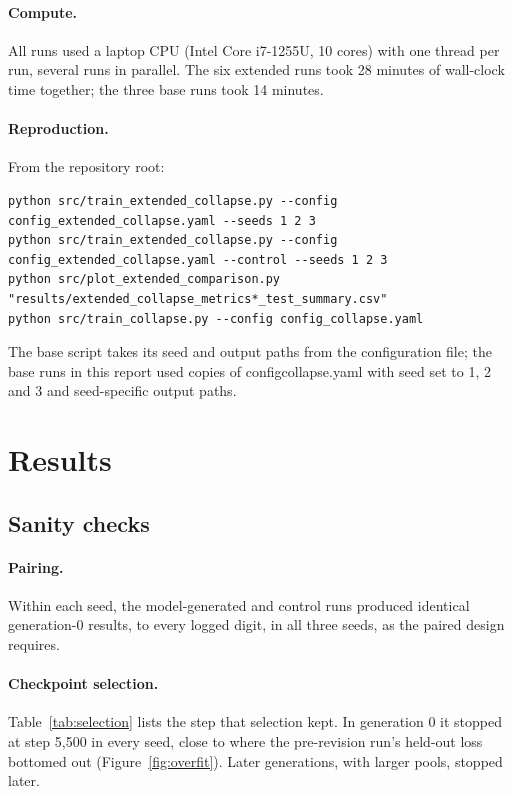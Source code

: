 \documentclass[11pt,a4paper]{article}
\DeclareRobustCommand{\code}[1]{\begingroup\ttfamily\def\_{\textunderscore\allowbreak}#1\endgroup}
\begin{document}
\paragraph{Compute.} All runs used a laptop CPU (Intel Core i7-1255U, 10 cores)
with one thread per run, several runs in parallel. The six extended runs took
28 minutes of wall-clock time together; the three base runs took
14 minutes.

\paragraph{Reproduction.} From the repository root:
\begin{Verbatim}[fontsize=\scriptsize, frame=single, framesep=2mm]
python src/train_extended_collapse.py --config config_extended_collapse.yaml --seeds 1 2 3
python src/train_extended_collapse.py --config config_extended_collapse.yaml --control --seeds 1 2 3
python src/plot_extended_comparison.py "results/extended_collapse_metrics*_test_summary.csv"
python src/train_collapse.py --config config_collapse.yaml
\end{Verbatim}
The base script takes its seed and output paths from the configuration file;
the base runs in this report used copies of \code{config\_collapse.yaml} with
\code{seed} set to 1, 2 and 3 and seed-specific output paths.

\section{Results}\label{sec:results}

\subsection{Sanity checks}
\paragraph{Pairing.} Within each seed, the model-generated and control runs
produced identical generation-0 results, to every logged digit, in all three
seeds, as the paired design requires.

\paragraph{Checkpoint selection.} Table~\ref{tab:selection} lists the step
that selection kept. In generation 0 it stopped at step 5{,}500 in every seed,
close to where the pre-revision run's held-out loss bottomed out
(Figure~\ref{fig:overfit}). Later generations, with larger pools, stopped
later.
\end{document}
